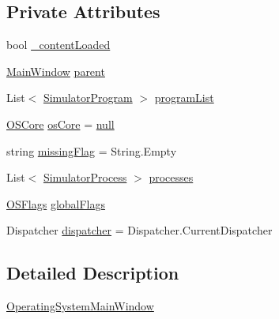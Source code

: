 \subsection*{Private Attributes}
\begin{DoxyCompactItemize}
\item 
bool \hyperlink{class_c_p_u___o_s___simulator_1_1_operating_system_main_window_a824bac181aa4f034115dfac40c744738}{\+\_\+content\+Loaded}
\item 
\hyperlink{class_c_p_u___o_s___simulator_1_1_main_window}{Main\+Window} \hyperlink{class_c_p_u___o_s___simulator_1_1_operating_system_main_window_a0219ba1583d00852bea36ac27c9d878d}{parent}
\item 
List$<$ \hyperlink{class_c_p_u___o_s___simulator_1_1_c_p_u_1_1_simulator_program}{Simulator\+Program} $>$ \hyperlink{class_c_p_u___o_s___simulator_1_1_operating_system_main_window_a83bef5323931616842c44d3f8d477fd2}{program\+List}
\item 
\hyperlink{class_c_p_u___o_s___simulator_1_1_operating___system_1_1_o_s_core}{O\+S\+Core} \hyperlink{class_c_p_u___o_s___simulator_1_1_operating_system_main_window_af944b743b4780850089320d08d38b0ed}{os\+Core} = \hyperlink{_old_01_process_01_flags_8cs_afb8e110345c45e74478894341ab6b28e}{null}
\item 
string \hyperlink{class_c_p_u___o_s___simulator_1_1_operating_system_main_window_ad3dd5030de453dd97f236e7677ab6732}{missing\+Flag} = String.\+Empty
\item 
List$<$ \hyperlink{class_c_p_u___o_s___simulator_1_1_operating___system_1_1_simulator_process}{Simulator\+Process} $>$ \hyperlink{class_c_p_u___o_s___simulator_1_1_operating_system_main_window_ab6bcbc8c33ec438d2f005d4c978e1a44}{processes}
\item 
\hyperlink{struct_c_p_u___o_s___simulator_1_1_operating___system_1_1_o_s_flags}{O\+S\+Flags} \hyperlink{class_c_p_u___o_s___simulator_1_1_operating_system_main_window_a905f81a88e7878e936352f6da9ffcb93}{global\+Flags}
\item 
Dispatcher \hyperlink{class_c_p_u___o_s___simulator_1_1_operating_system_main_window_ac0f8e9dfcaba558927c53e11815fb0fb}{dispatcher} = Dispatcher.\+Current\+Dispatcher
\end{DoxyCompactItemize}


\subsection{Detailed Description}
\hyperlink{class_c_p_u___o_s___simulator_1_1_operating_system_main_window}{Operating\+System\+Main\+Window} 

